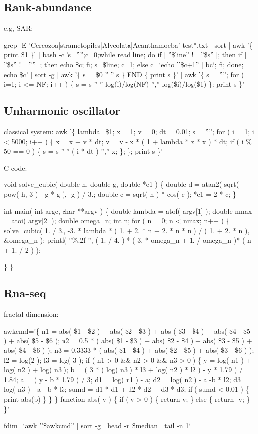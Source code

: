 \documentclass[a4paper]{article}
\begin{document}
\subsection{Rank-abundance} 

e.g, SAR:

grep -E 'Cercozoa|strametopiles|Alveolata|Acanthamoeba' test*.txt | sort | awk '\{ print \$1 \}' |  bash -c 's='''';c=0;while read line; do if [ ''\$line'' != ''\$s'' ]; then if [ ''\$s'' != '''' ]; then echo \$c; fi; s=\$line; c=1; else c=`echo ''\$c+1'' | bc`; fi; done; echo \$c' | sort -g | awk '\{ s = \$0 '' '' s \} END \{ print s \}' | awk '\{ s = ''''; for ( i=1; i <= NF; i++ ) \{ s = s '' '' log(i)/log(NF) '','' log(\$i)/log(\$1) \}; print s \}'

\subsection{Unharmonic oscillator}

classical system:
{\texttt \small
awk '\{ lambda=\$1; x = 1; v = 0; dt = 0.01; s = ''''; for ( i = 1; i < 5000; i++ ) \{ x = x + v * dt; v = v - x * ( 1 + lambda * x * x ) * dt; if ( i \% 50 == 0 ) \{ s = s '' '' ( i * dt ) '','' x; \}; \}; print s \}' 
}

C code:

{\texttt \small
void solve\_cubic( double h, double g, double *e1 ) \{ double d = atan2( sqrt( pow( h, 3 ) - g * g ), -g ) / 3.;   double c = sqrt( h ) * cos( c );  *e1 = 2 * c; \}

    
int main( int argc, char **argv ) 
\{  
    double lambda = atof( argv[1] );
    double nmax = atoi( argv[2] );
    double omega\_n;    
    int n;
    for ( n = 0; n < nmax; n++ )
    \{
        solve\_cubic( 1. / 3., -3. * lambda * ( 1. + 2. * n + 2. * n * n ) / ( 1. + 2. * n ), \&omega\_n );
        printf( ''\%.2f '', ( 1. / 4. ) * ( 3. * omega\_n + 1. / omega\_n )* ( n + 1. / 2 ) );

    \}
 \}
}
 
\subsection{Rna-seq}

fractal dimension:

{\texttt \small
awkcmd='\{ n1 = abs( \$1 - \$2 ) + abs( \$2 - \$3 ) + abs ( \$3 - \$4 ) + abs(  \$4 - \$5 ) + abs( \$5 - \$6 ); n2 = 0.5 * ( abs(  \$1 - \$3 ) + abs( \$2 - \$4 ) +  abs(  \$3 - \$5 ) + abs( \$4 - \$6 ) ); n3 = 0.3333 * ( abs(  \$1 - \$4 ) + abs( \$2 - \$5 ) + abs( \$3 - \$6 ) ); l2 = log(2 ); l3 = log( 3 );  if ( n1 > 0 \&\& n2 > 0 \&\& n3 > 0 ) \{ y = log( n1 ) + log( n2 ) + log( n3 ); b = ( 3 * ( log( n3 ) * l3 + log( n2 ) * l2 ) - y * 1.79 ) / 1.84; a = ( y - b * 1.79 ) / 3; d1 = log( n1 ) - a; d2 = log( n2 ) - a -b * l2; d3 = log( n3 ) - a - b * l3; sumd = d1 * d1 + d2 * d2 + d3 * d3; if ( sumd < 0.01 ) \{ print abs(b) \} \}  \} function abs( v ) \{ if ( v > 0 ) \{ return v; \} else \{ return -v; \} \}'

fdim=`awk ''\$awkcmd'' | sort -g | head -n \$median | tail -n 1`
}
\end{document}
